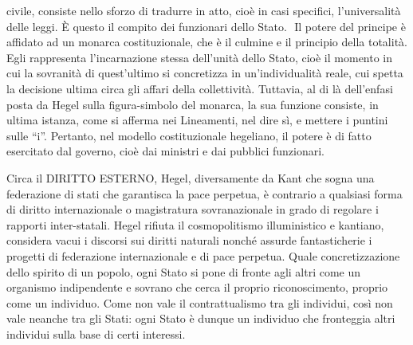 \documentclass[a4paper,12pt,oneside,openany]{book}%
\begin{document}
civile, consiste nello sforzo di tradurre in atto, cioè in casi specifici, l’universalità delle leggi. È questo il compito dei funzionari dello Stato.  Il potere del principe è affidato ad un monarca costituzionale, che è il culmine e il principio della totalità. Egli rappresenta l’incarnazione stessa dell’unità dello Stato, cioè il momento in cui la sovranità di quest’ultimo si concretizza in un’individualità reale, cui spetta la decisione ultima circa gli affari della collettività. Tuttavia, al di là dell’enfasi posta da Hegel sulla figura-simbolo del monarca, la sua funzione consiste, in ultima istanza, come si afferma nei Lineamenti, nel dire sì, e mettere i puntini sulle “i”. Pertanto, nel modello costituzionale hegeliano, il potere è di fatto esercitato dal governo, cioè dai ministri e dai pubblici funzionari.

Circa il DIRITTO ESTERNO, Hegel, diversamente da Kant che sogna una federazione di stati che garantisca la pace perpetua, è contrario a qualsiasi forma di diritto internazionale o magistratura sovranazionale in grado di regolare i rapporti inter-statali. Hegel rifiuta il cosmopolitismo illuministico e kantiano, considera vacui i discorsi sui diritti naturali nonché assurde fantasticherie i progetti di federazione internazionale e di pace perpetua. Quale concretizzazione dello spirito di un popolo, ogni Stato si pone di fronte agli altri come un organismo indipendente e sovrano che cerca il proprio riconoscimento, proprio come un individuo. Come non vale il contrattualismo tra gli individui, così non vale neanche tra gli Stati: ogni Stato è dunque un individuo che fronteggia altri individui sulla base di certi interessi.
\end{document}
